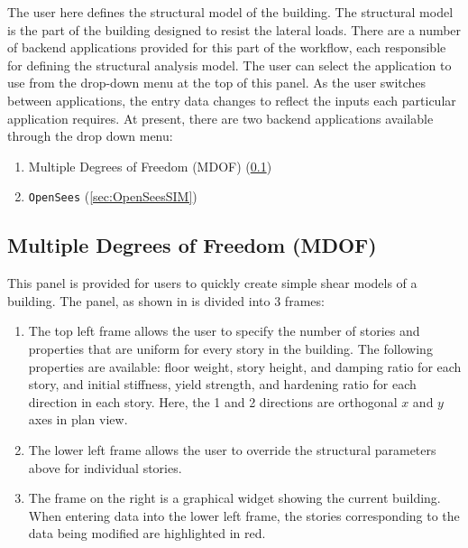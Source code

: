 The user here defines the structural model of the
building. The structural model is the part of the building designed
to resist the lateral loads. There are a number of backend
applications provided for this part of the workflow, each responsible
for defining the structural analysis model. The user can select the application to use from the drop-down menu at the top of this panel. As the user switches between applications,
the entry data changes to reflect the inputs each particular application requires. At present, there are two backend applications
available through the drop down menu: 

\begin{enumerate}
\item Multiple Degrees of Freedom (MDOF) (\ref{sec:MDOF})
\item \texttt{OpenSees} (\ref{sec:OpenSeesSIM})
\end{enumerate}

\subsection{Multiple Degrees of Freedom (MDOF)}\label{sec:MDOF}

This panel is provided for users to quickly create simple shear models
of a building. The panel, as shown in  is divided
into 3 frames:
\begin{enumerate}
\item The top left frame allows the user to specify the number of stories and properties that are uniform for every story in the building. The following properties are available: floor weight, story height, and damping ratio for each story, and initial stiffness, yield strength, and hardening ratio for each direction in each story. Here, the 1 and 2 directions are orthogonal $x$ and $y$ axes in plan view.
\item The lower left frame allows the user to override the structural parameters above for individual stories.
\item The frame on the right is a graphical widget showing the current building. When entering data into the lower left frame, the stories corresponding to the data being modified are highlighted in red.
\end{enumerate}

